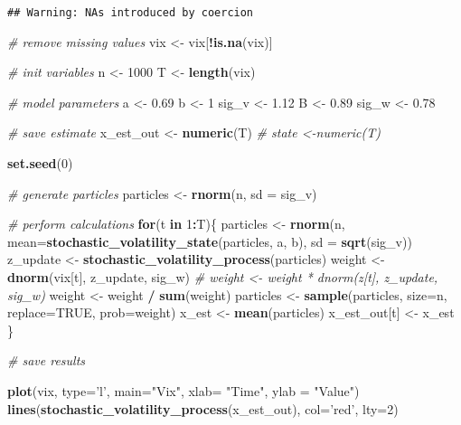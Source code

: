 \documentclass[
]{article}
\newenvironment{Shaded}{\begin{snugshade}}{\end{snugshade}}
\newcommand{\CommentTok}[1]{\textcolor[rgb]{0.56,0.35,0.01}{\textit{#1}}}
\newcommand{\ControlFlowTok}[1]{\textcolor[rgb]{0.13,0.29,0.53}{\textbf{#1}}}
\newcommand{\DataTypeTok}[1]{\textcolor[rgb]{0.13,0.29,0.53}{#1}}
\newcommand{\DecValTok}[1]{\textcolor[rgb]{0.00,0.00,0.81}{#1}}
\newcommand{\FloatTok}[1]{\textcolor[rgb]{0.00,0.00,0.81}{#1}}
\newcommand{\KeywordTok}[1]{\textcolor[rgb]{0.13,0.29,0.53}{\textbf{#1}}}
\newcommand{\NormalTok}[1]{#1}
\newcommand{\OperatorTok}[1]{\textcolor[rgb]{0.81,0.36,0.00}{\textbf{#1}}}
\newcommand{\OtherTok}[1]{\textcolor[rgb]{0.56,0.35,0.01}{#1}}
\newcommand{\StringTok}[1]{\textcolor[rgb]{0.31,0.60,0.02}{#1}}
\begin{document}
\begin{verbatim}
## Warning: NAs introduced by coercion
\end{verbatim}

\begin{Shaded}
\begin{Highlighting}[]
\CommentTok{# remove missing values}
\NormalTok{vix <-}\StringTok{ }\NormalTok{vix[}\OperatorTok{!}\KeywordTok{is.na}\NormalTok{(vix)]}

\CommentTok{# init variables}
\NormalTok{n <-}\StringTok{ }\DecValTok{1000}
\NormalTok{T  <-}\StringTok{ }\KeywordTok{length}\NormalTok{(vix)}

\CommentTok{# model parameters}
\NormalTok{a <-}\StringTok{ }\FloatTok{0.69}
\NormalTok{b <-}\StringTok{ }\DecValTok{1}
\NormalTok{sig_v <-}\StringTok{ }\FloatTok{1.12}
\NormalTok{B <-}\StringTok{ }\FloatTok{0.89}
\NormalTok{sig_w <-}\StringTok{ }\FloatTok{0.78}

\CommentTok{# save estimate}
\NormalTok{x_est_out <-}\StringTok{ }\KeywordTok{numeric}\NormalTok{(T)}
\CommentTok{# state <-numeric(T)}

\KeywordTok{set.seed}\NormalTok{(}\DecValTok{0}\NormalTok{)}

\CommentTok{# generate particles}
\NormalTok{particles <-}\StringTok{ }\KeywordTok{rnorm}\NormalTok{(n, }\DataTypeTok{sd =}\NormalTok{ sig_v)}

\CommentTok{# perform calculations}
\ControlFlowTok{for}\NormalTok{(t }\ControlFlowTok{in} \DecValTok{1}\OperatorTok{:}\NormalTok{T)\{}
\NormalTok{    particles <-}\StringTok{ }\KeywordTok{rnorm}\NormalTok{(n, }\DataTypeTok{mean=}\KeywordTok{stochastic_volatility_state}\NormalTok{(particles, a, b), }\DataTypeTok{sd =} \KeywordTok{sqrt}\NormalTok{(sig_v))}
\NormalTok{    z_update <-}\StringTok{ }\KeywordTok{stochastic_volatility_process}\NormalTok{(particles)}
\NormalTok{    weight <-}\StringTok{ }\KeywordTok{dnorm}\NormalTok{(vix[t], z_update, sig_w)}
    \CommentTok{# weight <- weight * dnorm(z[t], z_update, sig_w)}
\NormalTok{    weight  <-}\StringTok{ }\NormalTok{weight }\OperatorTok{/}\StringTok{ }\KeywordTok{sum}\NormalTok{(weight)}
\NormalTok{    particles <-}\StringTok{ }\KeywordTok{sample}\NormalTok{(particles, }\DataTypeTok{size=}\NormalTok{n, }\DataTypeTok{replace=}\OtherTok{TRUE}\NormalTok{, }\DataTypeTok{prob=}\NormalTok{weight)}
\NormalTok{    x_est <-}\StringTok{ }\KeywordTok{mean}\NormalTok{(particles)}
\NormalTok{    x_est_out[t] <-}\StringTok{ }\NormalTok{x_est}
\NormalTok{\}}

\CommentTok{# save results}

\KeywordTok{plot}\NormalTok{(vix, }\DataTypeTok{type=}\StringTok{'l'}\NormalTok{, }\DataTypeTok{main=}\StringTok{"Vix"}\NormalTok{, }\DataTypeTok{xlab=} \StringTok{"Time"}\NormalTok{, }\DataTypeTok{ylab =} \StringTok{"Value"}\NormalTok{)}
\KeywordTok{lines}\NormalTok{(}\KeywordTok{stochastic_volatility_process}\NormalTok{(x_est_out), }\DataTypeTok{col=}\StringTok{'red'}\NormalTok{, }\DataTypeTok{lty=}\DecValTok{2}\NormalTok{)}
\end{Highlighting}
\end{Shaded}
\end{document}

